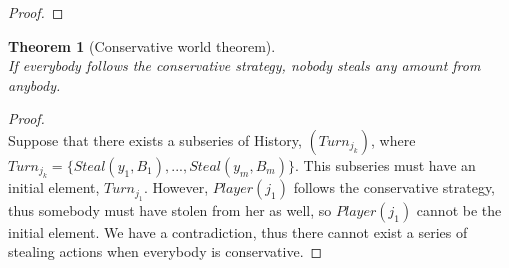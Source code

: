 \documentclass[11pt]{article}
\newtheorem{theorem}{Theorem}[section]
\theoremstyle{definition}
\theoremstyle{corollary}
\theoremstyle{lemma}
\begin{document}
\begin{proof}
    \end{proof}

    \begin{theorem}[Conservative world theorem] \ \\
    \label{conservativeworld}
       If everybody follows the conservative strategy, nobody steals any amount from anybody.
    \end{theorem}
    \begin{proof} \ \\
       Suppose that there exists a subseries of History, $(Turn_{j_k})$, where $Turn_{j_k} = \{Steal(y_1,B_1),...,
       Steal(y_m,B_m)\}$. This subseries must have an initial element, $Turn_{j_1}$. However, $Player(j_1)$ follows the conservative
       strategy, thus somebody must have stolen from her as well, so $Player(j_1)$ cannot be the initial element. We have a
       contradiction, thus there cannot exist a series of stealing actions when everybody is conservative.
    \end{proof}
\end{document}
